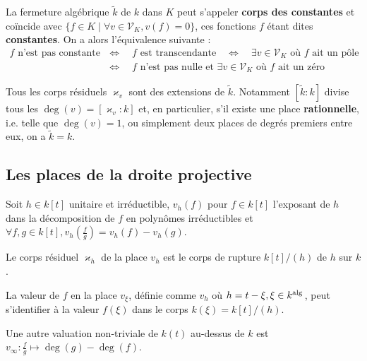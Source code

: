 	\begin{pop}
		La fermeture algébrique $\tilde{k}$ de $k$ dans $K$ peut s'appeler \textbf{corps des constantes} et coïncide avec $\{ f \in K \mid \forall v \in \mathscr{V}_K, v(f) = 0 \}$, ces fonctions $f$ étant dites \textbf{constantes}.
		On a alors l'équivalence suivante :
		\begin{align*}
		\text{$f$ n'est pas constante} & \iff \quad \text{$f$ est transcendante} \quad \iff \quad \text{$\exists v \in \mathscr{V}_K$ où $f$ ait un pôle} \\
		                               & \iff \quad \text{$f$ n'est pas nulle et $\exists v \in \mathscr{V}_K$ où $f$ ait un zéro}
		\end{align*}
	\end{pop}
	
	\begin{rem}
		Tous les corps résiduels $\varkappa_v$ sont des extensions de $\tilde{k}$.
		Notamment $[\tilde{k} : k]$ divise tous les $\deg(v) = [\varkappa_v : k]$ et, en particulier, s'il existe une place \textbf{rationnelle}, i.e. telle que $\deg(v) = 1$, ou simplement deux places de degrés premiers entre eux, on a $\tilde{k} = k$.
	\end{rem}

\subsection{Les places de la droite projective}

	Soit $h \in k[t]$ unitaire et irréductible, $v_h(f)$ pour $f \in k[t]$ l'exposant de $h$ dans la décomposition de $f$ en polynômes irréductibles et $\forall f,g \in k[t], v_h \left( \frac{f}{g} \right) = v_h(f) - v_h(g)$.

	\begin{pop}
		Le corps résiduel $\varkappa_h$ de la place $v_h$ est le corps de rupture $k[t] / (h)$ de $h$ sur $k$.
	\end{pop}

	\begin{rem}
		La valeur de $f$ en la place $v_\xi$, définie comme $v_h$ où $h = t - \xi, \xi \in k^{\operatorname{alg}{}}$, peut s'identifier à la valeur $f(\xi)$ dans le corps $k(\xi) = k[t] / (h)$.
	\end{rem}
	
	\begin{rem}
		Une autre valuation non-triviale de $k(t)$ au-dessus de $k$ est $v_\infty \colon \frac{f}{g} \mapsto \deg(g) - \deg(f)$.
	\end{rem}
	
